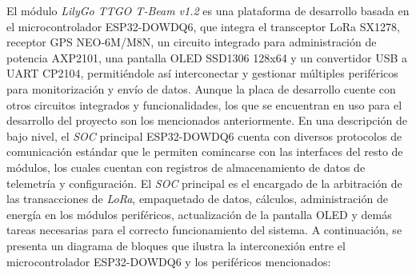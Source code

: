 \documentclass[journal]{IEEEtran}
\begin{document}
El módulo \textit{LilyGo TTGO T-Beam v1.2} es una plataforma de desarrollo basada en el microcontrolador ESP32-DOWDQ6, que integra el transceptor LoRa SX1278, receptor GPS NEO-6M/M8N, un circuito integrado para administración de potencia AXP2101, una pantalla OLED SSD1306 128x64 y un convertidor USB a UART CP2104, permitiéndole así interconectar y gestionar múltiples periféricos para monitorización y envío de datos. Aunque la placa de desarrollo cuente con otros circuitos integrados y funcionalidades, los que se encuentran en uso para el desarrollo del proyecto son los mencionados anteriormente. En una descripción de bajo nivel, el \textit{SOC} principal ESP32-DOWDQ6 cuenta con diversos protocolos de comunicación estándar que le permiten comincarse con las interfaces del resto de módulos, los cuales cuentan con registros de almacenamiento de datos de telemetría y configuración. El \textit{SOC} principal es el encargado de la arbitración de las transacciones de \textit{LoRa}, empaquetado de datos, cálculos, administración de energía en los módulos periféricos, actualización de la pantalla OLED y demás tareas necesarias para el correcto funcionamiento del sistema. A continuación, se presenta un diagrama de bloques que ilustra la interconexión entre el microcontrolador ESP32-DOWDQ6 y los periféricos mencionados:
\end{document}
